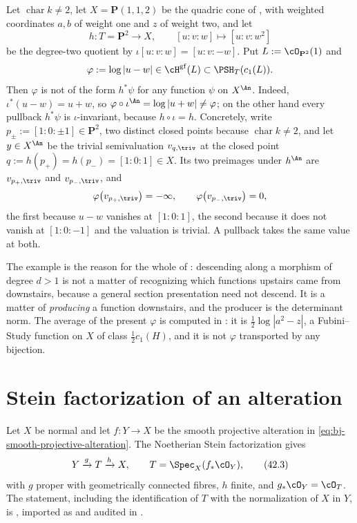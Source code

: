 \begin{example}
\label{ex:ch42-not-a-pullback}
Let $\operatorname{char}k\ne2$, let $X=\mathbf P(1,1,2)$ be the quadric
cone of , with weighted coordinates $a,b$ of
weight one and $z$ of weight two, and let
\[
 h:T=\mathbf P^2\longrightarrow X,\qquad [u:v:w]\longmapsto[u:v:w^2]
\]
be the degree-two quotient by $\iota[u:v:w]=[u:v:-w]$.  Put
$L:=\cO_{\mathbf P^2}(1)$ and
\[
 \varphi:=\log|u-w|\in\cH^{\mathrm{gf}}(L)\subset\PSH_T(c_1(L)).
\]
Then $\varphi$ is not of the form $h^*\psi$ for any function $\psi$ on
$X^{\An}$.  Indeed, $\iota^*(u-w)=u+w$, so $\varphi\circ\iota^{\An}
=\log|u+w|\ne\varphi$; on the other hand every pullback $h^*\psi$ is
$\iota$-invariant, because $h\circ\iota=h$.  Concretely, write
$p_\pm:=[1:0:\pm1]\in\mathbf P^2$, two distinct closed points because
$\operatorname{char}k\ne2$, and let $y\in X^{\An}$ be the trivial
semivaluation $v_{q,\triv}$ at the closed point $q:=h(p_+)=h(p_-)
=[1:0:1]\in X$.  Its two preimages under $h^{\An}$ are
$v_{p_+,\triv}$ and $v_{p_-,\triv}$, and
\[
 \varphi\bigl(v_{p_+,\triv}\bigr)=-\infty,
 \qquad
 \varphi\bigl(v_{p_-,\triv}\bigr)=0,
\]
the first because $u-w$ vanishes at $[1:0:1]$, the second because it does
not vanish at $[1:0:-1]$ and the valuation is trivial.  A pullback takes
the same value at both.

The example is the reason for the whole of :
descending along a morphism of degree $d>1$ is not a matter of recognizing
which functions upstairs came from downstairs, because a general section presentation need not descend.  It is a matter of \emph{producing} a function
downstairs, and the producer is the determinant norm.  The average of the
present $\varphi$ is computed in : it is
$\tfrac12\log|a^2-z|$, a Fubini--Study function on $X$ of class
$\tfrac12c_1(H)$, and it is not $\varphi$ transported by any bijection.
\end{example}

\section{Stein factorization of an alteration}
\label{sec:ch42-stein}

Let $X$ be normal and let $f:Y\to X$ be the smooth projective alteration
in \eqref{eq:bj-smooth-projective-alteration}.
The Noetherian Stein factorization gives
\[
                 Y\xrightarrow{g}T\xrightarrow{h}X,
                 \qquad
                 T=\Spec_X(f_*\cO_Y),
\tag{42.3}\label{eq:bj-alteration-stein}
\]
with $g$ proper with geometrically connected fibres, $h$ finite, and
$g_*\cO_Y=\cO_T$.
The statement, including the identification of $T$ with the normalization
of $X$ in $Y$, is
\cite[\href{https://stacks.math.columbia.edu/tag/03H0}{Tag 03H0}]
{stacks-project}, imported as  and
audited in .

